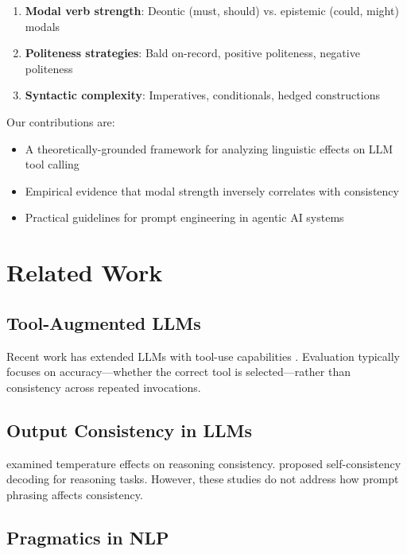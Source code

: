 \documentclass[11pt]{article}
\begin{document}
\begin{enumerate}
    \item \textbf{Modal verb strength}: Deontic (must, should) vs. epistemic (could, might) modals
    \item \textbf{Politeness strategies}: Bald on-record, positive politeness, negative politeness
    \item \textbf{Syntactic complexity}: Imperatives, conditionals, hedged constructions
\end{enumerate}

Our contributions are:
\begin{itemize}
    \item A theoretically-grounded framework for analyzing linguistic effects on LLM tool calling
    \item Empirical evidence that modal strength inversely correlates with consistency
    \item Practical guidelines for prompt engineering in agentic AI systems
\end{itemize}

\section{Related Work}

\subsection{Tool-Augmented LLMs}

Recent work has extended LLMs with tool-use capabilities \cite{schick2023toolformer,patil2023gorilla,qin2023toolllm}. Evaluation typically focuses on accuracy---whether the correct tool is selected---rather than consistency across repeated invocations.

\subsection{Output Consistency in LLMs}

\citet{renze2024effect} examined temperature effects on reasoning consistency. \citet{wang2023self} proposed self-consistency decoding for reasoning tasks. However, these studies do not address how prompt phrasing affects consistency.

\subsection{Pragmatics in NLP}
\end{document}
